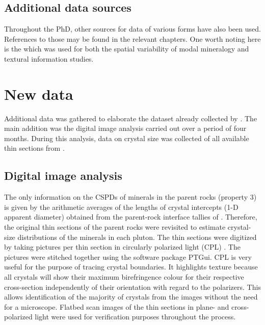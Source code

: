     \subsection{Additional data sources}
    Throughout the PhD, other sources for data of various forms have also been used. %
    References to those may be found in the relevant chapters. %
    One worth noting here is the \Textcite{Vistelius_et_al_1983} which was used for both the spatial variability of modal mineralogy and textural information studies. %


\section{New data}
Additional data was gathered to elaborate the dataset already collected by \Textcite{Heins_1992}. %
The main addition was the digital image analysis carried out over a period of four months. %
During this analysis, data on crystal size was collected of all available thin sections from \Textcite{Heins_1992}. %

    \subsection{Digital image analysis}
    The only information on the CSPDs of minerals in the parent rocks (property 3) is given by the arithmetic averages of the lengths of crystal intercepts (1-D apparent diameter) obtained from the parent-rock interface tallies of \Textcite{Heins_1992}. %
    Therefore, the original thin sections of the parent rocks were revisited to estimate crystal-size distributions of the minerals in each pluton. %
    The thin sections were digitized by taking  pictures per thin section in circularly polarized light (CPL) \Textcite{Higgins_2010}. %
    The pictures were stitched together using the software package PTGui. %
    CPL is very useful for the purpose of tracing crystal boundaries. %
    It highlights texture because all crystals will show their maximum birefringence colour for their respective cross-section independently of their orientation with regard to the polarizers. %
    This allows identification of the majority of crystals from the images without the need for a microscope. %
    Flatbed scan images of the thin sections in plane- and cross-polarized light were used for verification purposes throughout the process. %

